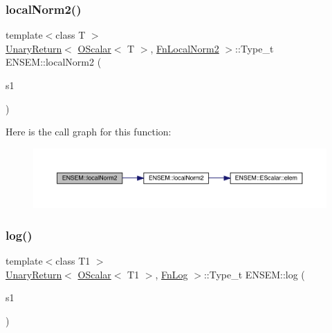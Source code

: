 \subsubsection{\texorpdfstring{localNorm2()}{localNorm2()}}
{\footnotesize\ttfamily template$<$class T $>$ \\
\mbox{\hyperlink{structENSEM_1_1UnaryReturn}{Unary\+Return}}$<$ \mbox{\hyperlink{classENSEM_1_1OScalar}{O\+Scalar}}$<$ T $>$, \mbox{\hyperlink{structENSEM_1_1FnLocalNorm2}{Fn\+Local\+Norm2}} $>$\+::Type\+\_\+t E\+N\+S\+E\+M\+::local\+Norm2 (\begin{DoxyParamCaption}\item[{const \mbox{\hyperlink{classENSEM_1_1OScalar}{O\+Scalar}}$<$ T $>$ \&}]{s1 }\end{DoxyParamCaption})\hspace{0.3cm}{\ttfamily [inline]}}

Here is the call graph for this function\+:\nopagebreak
\begin{figure}[H]
\begin{center}
\leavevmode
\includegraphics[width=350pt]{d1/d71/group__obsscalar_ga2bc0a069388839d76a68f281dce936a6_cgraph}
\end{center}
\end{figure}
\mbox{\label{group__obsscalar_gac3f245df6eb6b0c94e6aa959b1e7676c}} 
\subsubsection{\texorpdfstring{log()}{log()}}
{\footnotesize\ttfamily template$<$class T1 $>$ \\
\mbox{\hyperlink{structENSEM_1_1UnaryReturn}{Unary\+Return}}$<$ \mbox{\hyperlink{classENSEM_1_1OScalar}{O\+Scalar}}$<$ T1 $>$, \mbox{\hyperlink{structENSEM_1_1FnLog}{Fn\+Log}} $>$\+::Type\+\_\+t E\+N\+S\+E\+M\+::log (\begin{DoxyParamCaption}\item[{const \mbox{\hyperlink{classENSEM_1_1OScalar}{O\+Scalar}}$<$ T1 $>$ \&}]{s1 }\end{DoxyParamCaption})\hspace{0.3cm}{\ttfamily [inline]}}

